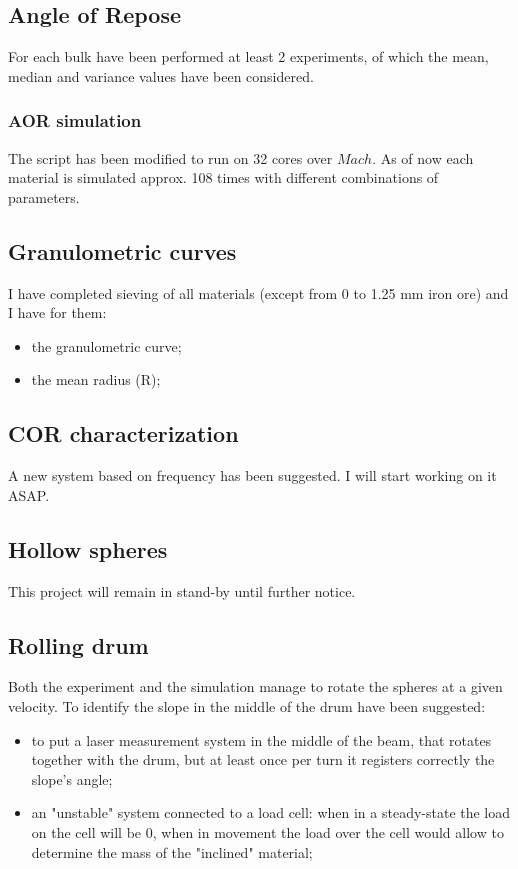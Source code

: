 \subsection{Angle of Repose}
\label{subsection:aor}

For each bulk have been performed at least 2 experiments, of which the mean, median and variance values have been considered.\\

\subsubsection{AOR simulation}
\label{subsubsection:aorsimulation}

The script has been modified to run on 32 cores over $Mach$. As of now each material is simulated approx. 108 times with different combinations of parameters.\\

\subsection{Granulometric curves}
\label{subsection:granulometric curves}

I have completed sieving of all materials (except from 0 to 1.25 mm iron ore) and I have for them:
\begin{itemize}
\item{the granulometric curve;}
\item{the mean radius (R);}
\end{itemize}

\subsection{COR characterization}
\label{subsection:corcharacterization}

A new system based on frequency has been suggested. I will start working on it ASAP.

\subsection{Hollow spheres}
\label{subsection:hollowspheres}

This project will remain in stand-by until further notice.

\subsection{Rolling drum}
\label{subsection:rolling drum}

Both the experiment and the simulation manage to rotate the spheres at a given velocity.
To identify the slope in the middle of the drum have been suggested:
\begin{itemize}
\item{to put a laser measurement system in the middle of the beam, that rotates together with the drum, but at least once per turn it registers correctly the slope's angle;}
\item{an "unstable" system connected to a load cell: when in a steady-state the load on the cell will be $0$, when in movement the load over the cell would allow to determine the mass of the "inclined" material;}
\end{itemize}
